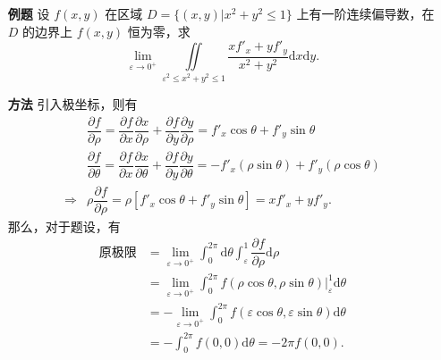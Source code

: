 \begin{enumerate}
    \item[\textbf{例题}] 设 $ f(x,y) $ 在区域 $ D = \{(x,y)|x^2+y^2\leq 1\} $ 
    上有一阶连续偏导数，在 $ D $ 的边界上 $ f(x,y) $ 恒为零，求
    $$
        {\displaystyle\lim_{\varepsilon\rightarrow 0^+}}\iint\limits_{\varepsilon^2\leq x^2+y^2\leq 1}
        \dfrac{xf'_x+yf'_y}{x^2+y^2}\mathrm{d}x\mathrm{d}y.
    $$
    \item[\textbf{方法}] 引入极坐标，则有
    \begin{equation*}
        \begin{aligned}
            &\dfrac{\partial f}{\partial \rho} = 
            \dfrac{\partial f}{\partial x}\dfrac{\partial x}{\partial \rho}
            + \dfrac{\partial f}{\partial y}\dfrac{\partial y}{\partial \rho}
            = f'_x\cos\theta + f'_y\sin\theta \\ 
            &\dfrac{\partial f}{\partial \theta} = 
            \dfrac{\partial f}{\partial x}\dfrac{\partial x}{\partial \theta}
            + \dfrac{\partial f}{\partial y}\dfrac{\partial y}{\partial \theta}
            = -f'_x(\rho \sin\theta)+f'_y(\rho \cos\theta)\\ 
            \Rightarrow & \rho \dfrac{\partial f}{\partial \rho} = 
            \rho\left[f'_x\cos\theta + f'_y\sin\theta\right]
            =xf'_x+yf'_y.
        \end{aligned}
    \end{equation*}
    那么，对于题设，有
    \begin{equation*}
        \begin{aligned}
            \textrm{原极限}&= {\displaystyle\lim_{\varepsilon\rightarrow 0^+}}
            \int_0^{2\pi}\mathrm{d}\theta\int_{\varepsilon}^1
            \dfrac{\partial f}{\partial \rho}\mathrm{d}\rho \\ 
            &= {\displaystyle\lim_{\varepsilon\rightarrow 0^+}}
            \int_0^{2\pi}f(\rho\cos\theta,\rho\sin\theta)\Big|_\varepsilon^1\mathrm{d}\theta\\
            &= -{\displaystyle\lim_{\varepsilon\rightarrow 0^+}}
            \int_0^{2\pi}f(\varepsilon\cos\theta,\varepsilon\sin\theta)\mathrm{d}\theta \\ 
            &= -\int_0^{2\pi}f(0,0)\mathrm{d}\theta = -2\pi f(0,0).
        \end{aligned}
    \end{equation*}
\end{enumerate}


